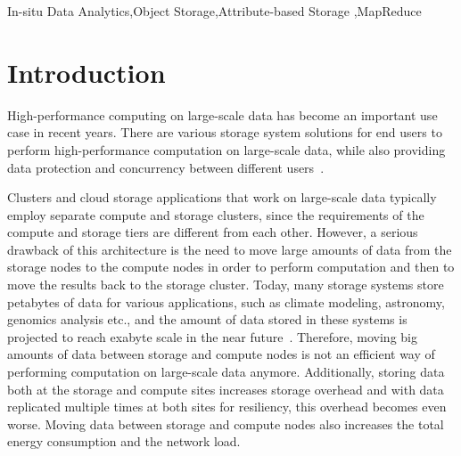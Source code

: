 \documentclass[preprint,12pt]{elsarticle}
\begin{document}
\begin{frontmatter}
\begin{keyword}
In-situ Data Analytics\sep Object Storage\sep Attribute-based Storage
\sep MapReduce



\end{keyword}

\end{frontmatter}


\section{Introduction}
\label{sec-introduction}
High-performance computing on large-scale data has become an
important use case in recent years. There are various storage
system solutions for end users to perform high-performance
computation on large-scale data, while also providing data
protection and concurrency between different users~\cite{amazon_ec2}.

Clusters and cloud storage applications that work on large-scale
data typically employ separate compute and storage clusters, since
the requirements of the compute and storage tiers are different
from each other. However, a serious drawback of this architecture
is the need to move large amounts of data from the storage nodes to the 
compute nodes in order to perform computation and then to move
the results back to the storage cluster. Today, many storage
systems store petabytes of data for various applications, such as
climate modeling, astronomy, genomics analysis etc., and the amount
of data stored in these systems is projected to reach exabyte scale in
the near
future~\cite{idcbigdata}. Therefore, moving big amounts of data
between storage and compute nodes is not an efficient way of performing
computation on large-scale data anymore. Additionally, storing data
both at the storage and compute sites increases storage overhead
and with data replicated multiple times at both sites for resiliency,
this overhead becomes even worse. Moving data between storage and
compute nodes also increases the total energy consumption and the
network load.
\end{document}
